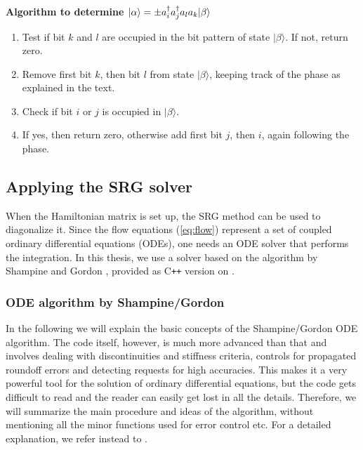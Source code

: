 \begin{framed}
\begin{center}
\textbf{Algorithm to determine $|\alpha\rangle = \pm a^{\dagger}_i a^{\dagger}_j a_l a_k |\beta \rangle$}
\end{center}
\begin{enumerate}
\item Test if bit $k$ and $l$ are occupied in the bit pattern of state $|\beta\rangle$. If not, return zero.
\item Remove first bit $k$, then bit $l$ from state $|\beta\rangle$, keeping track of the phase as explained in the text.
\item Check if bit $i$ or $j$ is occupied in $|\beta\rangle$.
\item If yes, then return zero, otherwise add first bit $j$, then $i$, again following the phase.
\end{enumerate}
\end{framed}
 
\subsection{Applying the SRG solver}
\label{subsec:SRG}
When the Hamiltonian matrix is set up, the SRG method can be used to diagonalize it. Since the flow equations (\ref{eq:flow}) represent a set of coupled ordinary differential equations (ODEs), one needs an ODE solver that performs the integration. In this thesis, we use a solver based on the algorithm by Shampine and Gordon \cite{shampine1975computer}, provided as C{}\verb!++! version on \cite{odesolver}.\\

\subsubsection{ODE algorithm by Shampine/Gordon}
In the following we will explain the basic concepts of the Shampine/Gordon ODE algorithm. The code itself, however, is much more advanced than that and involves dealing with discontinuities and stiffness criteria, controls for propagated roundoff errors and detecting requests for high accuracies. This makes it a very powerful tool for the solution of ordinary differential equations, but the code gets difficult to read and the reader can easily get lost in all the details. Therefore, we will summarize the main procedure and ideas of the algorithm, without mentioning all the minor functions used for error control etc. For a detailed explanation, we refer instead to \cite{shampine1975computer}.

